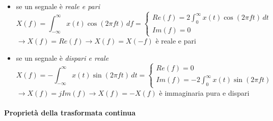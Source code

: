 \documentclass[
  paper=a4,
  ,captions=tableheading
]{scrartcl}
\providecommand{\tightlist}{%
  \setlength{\itemsep}{0pt}\setlength{\parskip}{0pt}}
\begin{document}
\begin{enumerate}
  \begin{itemize}
  \tightlist
  \item
    se un segnale è \emph{reale e pari} \[
    X(f) = \int_{-\infty}^\infty x(t) \cos(2\pi ft) \,df=
    \left\{ \begin{array}{cl}
    Re(f) = 2\int_{0}^\infty x(t) \cos(2\pi ft) \,dt \\
    Im(f) = 0
    \end{array} \right.
    \] \(\to X(f) = Re(f) \to X(f)=X(-f)\) è reale e pari
  \item
    se un segnale è \emph{dispari e reale} \[
    X(f) = - \int_{-\infty}^\infty x(t) \sin(2\pi ft) \,dt=
    \left\{ \begin{array}{cl}
    Re(f) = 0 \\
    Im(f) = -2\int_{0}^\infty x(t) \sin(2\pi ft) 
    \end{array} \right.
    \] \(\to X(f)=jIm(f) \to X(f)=-X(f)\) è immaginaria pura e dispari
  \end{itemize}
\end{enumerate}

\paragraph{Proprietà della trasformata
continua}\label{proprietuxe0-della-trasformata-continua}
\end{document}
